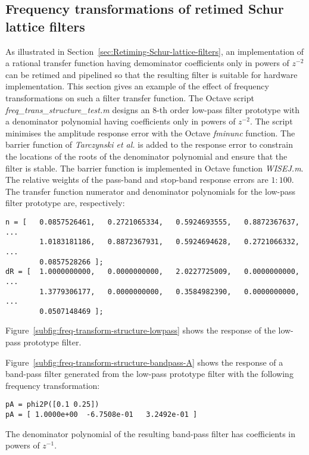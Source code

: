 \documentclass[a4paper,twoside,10pt,english]{report}
\begin{document}
\clearpage
\subsection{Frequency transformations of retimed Schur lattice filters}
As illustrated in Section~\ref{sec:Retiming-Schur-lattice-filters},
an implementation of a rational transfer function having
demominator coefficients only in powers of $z^{-2}$ can be retimed and
pipelined so that the resulting filter is suitable for hardware 
implementation. This section gives an example of the effect of frequency
transformations on such a filter transfer function. The Octave script
\emph{freq\_trans\_structure\_test.m} designs an $8$-th order
low-pass filter prototype with a denominator polynomial having
coefficients only in powers of $z^{-2}$. The script minimises the amplitude 
response error with the Octave \emph{fminunc} function. The barrier function 
of \emph{Tarczynski et al.} 
\cite{TarczynskiCainHermanowiczRojewski_WISEMethodDesignIIRFilters} is added
to the response error to constrain the locations of the roots of the 
denominator polynomial and ensure that the filter is stable. The barrier 
function is implemented in Octave function \emph{WISEJ.m}. The relative weights
of the pass-band and stop-band response
errors are $1:100$. The transfer function numerator and denominator polynomials
for the low-pass filter prototype are, respectively:
\begin{small}
\begin{verbatim}
n = [   0.0857526461,   0.2721065334,   0.5924693555,   0.8872367637, ...
        1.0183181186,   0.8872367931,   0.5924694628,   0.2721066332, ...
        0.0857528266 ];
dR = [  1.0000000000,   0.0000000000,   2.0227725009,   0.0000000000, ...
        1.3779306177,   0.0000000000,   0.3584982390,   0.0000000000, ...
        0.0507148469 ];
\end{verbatim}
\end{small}
Figure~\ref{subfig:freq-transform-structure-lowpass} shows the response of 
the low-pass prototype filter. 

Figure~\ref{subfig:freq-transform-structure-bandpass-A} shows the response of a band-pass filter generated from the low-pass prototype filter with the
following frequency transformation:
\begin{small}
\begin{verbatim}
pA = phi2P([0.1 0.25])
pA = [ 1.0000e+00  -6.7508e-01   3.2492e-01 ]
\end{verbatim}
\end{small}
The denominator polynomial of the resulting band-pass filter has coefficients
in powers of $z^{-1}$. 
\end{document}
